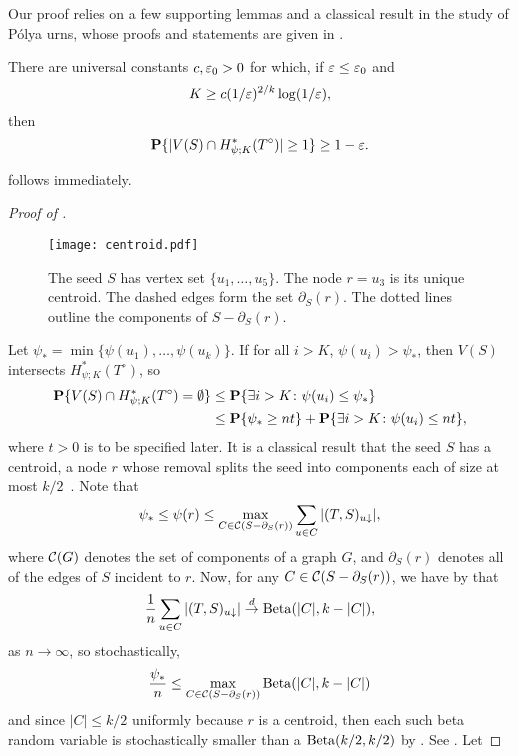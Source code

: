 Our proof relies on a few supporting lemmas and a classical result in
the study of P\'{o}lya urns, whose proofs and statements are given in
.
\begin{prop}
  There are universal constants $c, \varepsilon_0 > 0$ for which, if
  $\varepsilon \le \varepsilon_0$ and
  \[
    K \ge c (1/\varepsilon)^{2/k} \log(1/\varepsilon) ,
  \]
  then
  \[
    \operatorname{\mathbf{P}}\{|V(S) \cap H^*_{\psi; K}(T^\circ)| \ge 1 \} \ge 1 - \varepsilon .
  \]
\end{prop}
 follows immediately.
\begin{proof}[Proof of ]
  \begin{figure}
    \centering
    \texttt{[image: centroid.pdf]}
    \caption{The seed $S$ has vertex set $\{u_1, \dots, u_5\}$. The
      node $r = u_3$ is its unique centroid. The dashed edges form the
      set $\partial_S(r)$. The dotted lines outline the components of
      $S - \partial_S(r)$.}
  \end{figure}
  Let $\psi_* = \min\{\psi(u_1), \dots, \psi(u_k)\}$. If for all
  $i > K$, $\psi(u_i) > \psi_*$, then $V(S)$ intersects
  $H^*_{\psi; K}(T^\circ)$, so
  \begin{align}
    \Pr\{V(S) \cap H^*_{\psi; K}(T^\circ) = \emptyset\} &\le \Pr\{\exists i > K \colon \psi(u_i) \le \psi_*\} \notag \\
                                                        &\le \Pr\{\psi_* \ge nt\} + \Pr\{\exists i > K \colon \psi(u_i) \le nt\} , \eqlabel{phi-tail}
  \end{align}
  where $t > 0$ is to be specified later. It is a classical result
  that the seed $S$ has a centroid, \ie a node $r$ whose removal
  splits the seed into components each of size at most
  $k/2$~\cite{jordan-centroid}. Note that
  \[
    \psi_* \le \psi(r) \le \max_{C \in \mathcal{C}(S - \partial_S(r))} \sum_{u \in
      C} |(T, S)_{u \downarrow}| ,
  \]
  where $\mathcal{C}(G)$ denotes the set of components of a graph $G$, and
  $\partial_S(r)$ denotes all of the edges of $S$ incident to
  $r$. Now, for any $C \in \mathcal{C}(S - \partial_S(r))$, we have by
   that
  \[
    \frac{1}{n} \sum_{u \in C} |(T, S)_{u \downarrow}| \overset{d}{\to} \operatorname{Beta}(|C|, k - |C|) ,
  \]
  as $n \to \infty$, so stochastically,
  \[
    \frac{\psi_*}{n} \le \max_{C \in \mathcal{C}(S - \partial_S(r))} \operatorname{Beta}(|C|, k - |C|)
  \]
  and since $|C| \le k/2$ uniformly because $r$ is a centroid, then
  each such beta random variable is stochastically smaller than a
  $\operatorname{Beta}(k/2, k/2)$ by . See . Let

\end{proof}
